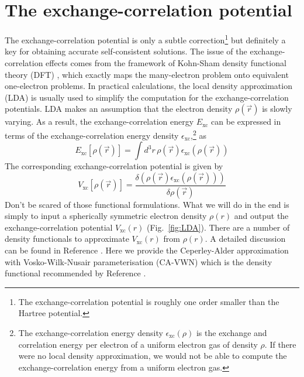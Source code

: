 \section{The exchange-correlation potential}
The exchange-correlation potential is only a subtle correction\footnote{The
exchange-correlation potential is roughly one order smaller than
the Hartree potential.} but definitely a key for obtaining
accurate self-consistent solutions. The issue of the exchange-correlation
effects comes from the framework of Kohn-Sham density functional theory (DFT) \cite{KS}, which
exactly maps the many-electron problem onto equivalent one-electron problems. In practical
calculations, the local density approximation (LDA) is usually used to simplify the computation
for the exchange-correlation potentials. LDA makes an assumption that the electron density
$\rho(\vec{r})$ is slowly varying. As a result, the exchange-correlation energy
$E_{\text{xc}}$ can be expressed in terms of the exchange-correlation energy
density $\epsilon_{\text{xc}}$,\footnote{The exchange-correlation energy density $\epsilon_{\text{xc}}(\rho)$
is the exchange and correlation energy per electron of a uniform electron
gas of density $\rho$. If there were no local density approximation, we would not
be able to compute the exchange-correlation energy from a uniform electron gas.} as
\begin{equation} \label{eq:Exc}
E_{\text{xc}}[\rho(\vec{r})] = \int d^3r\, \rho(\vec{r}) \epsilon_{\text{xc}}(\rho(\vec{r}))
\end{equation}
%
The corresponding exchange-correlation potential is given by
\begin{equation} \label{eq:Vxc}
V_{\text{xc}}[\rho(\vec{r})] = \frac{\delta \left( \rho(\vec{r}) \epsilon_{\text{xc}}(\rho(\vec{r})) \right)}{\delta \rho(\vec{r})}
\end{equation}
%
Don't be scared of those functional formulations. What we will do in the end is
simply to input a spherically symmetric electron density $\rho(r)$ and output
the exchange-correlation potential $V_{\text{xc}}(r)$ (Fig.~\ref{fig:LDA}).
There are a number of density functionals to approximate
$V_{\text{xc}}(r)$ from $\rho(r)$. A detailed discussion can be found in Reference
\cite{LDA}. Here we provide the Ceperley-Alder approximation with Vosko-Wilk-Nusair
parameterisation (CA-VWN) which is the density functional recommended by Reference \cite{LDA}.

